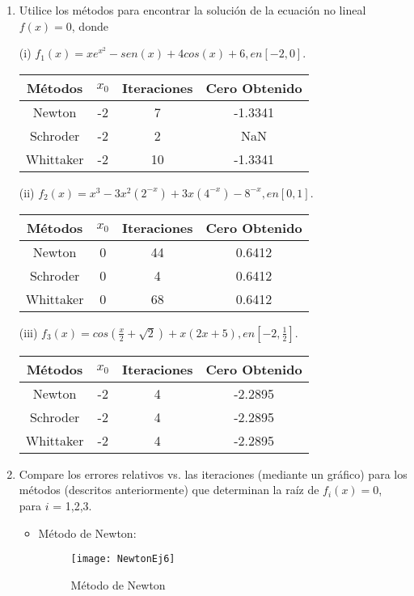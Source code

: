 \documentclass{udpreport}
\begin{document}
\begin{enumerate}
\begin{itemize}
\end{itemize}
	\begin{enumerate}
	
		\item Utilice los métodos para encontrar la solución de la ecuación no lineal $f(x)=0$, donde
		
		(i) $f_{1}(x)=xe^{x^2}-sen(x)+4cos(x)+6, en [-2,0].$
		
		\begin{table}[H]
			\centering
			\begin{tabular}{|c|c|c|c|}
				\hline
				Métodos & $x_{0}$ & Iteraciones & Cero Obtenido \\
				\hline
				Newton & -2 &  7 & -1.3341\\
				\hline
				Schroder & -2 & 2 & NaN \\
				\hline
				Whittaker & -2 & 10 & -1.3341 \\
				\hline				
			\end{tabular}
			\end{table}	
		
		
		
		(ii) $f_{2}(x)=x^3-3x^2(2^{-x})+3x(4^{-x})-8^{-x}, en [0,1].$
		
			\begin{table}[H]
			\centering
			\begin{tabular}{|c|c|c|c|}
				\hline
				Métodos & $x_{0}$ & Iteraciones & Cero Obtenido \\
				\hline
				Newton & 0 & 44 &  0.6412 \\
				\hline
				Schroder & 0 & 4 & 0.6412\\
				\hline
				Whittaker & 0 & 68 & 0.6412\\
				\hline				
			\end{tabular}
			\end{table}	
			
		(iii) $f_{3}(x)=cos(\frac{x}{2}+\sqrt{2})+x(2x+5), en [-2,\frac{1}{2}].$	
		
		\begin{table}[H]
			\centering
			\begin{tabular}{|c|c|c|c|}
				\hline
				Métodos & $x_{0}$ & Iteraciones & Cero Obtenido \\
				\hline
				Newton & -2 & 4 &  -2.2895 \\
				\hline
				Schroder & -2 &  4 & -2.2895\\
				\hline
				Whittaker & -2 & 4 & -2.2895 \\
				\hline				
			\end{tabular}
		\end{table}		
\newpage			
		\item Compare los errores relativos vs. las iteraciones (mediante un gráfico) para los métodos (descritos
			anteriormente) que determinan la raíz de $f_{i}(x)=0$, para $i$ = 1,2,3.	
			\begin{itemize}
				\item Método de Newton:
				\begin{figure}[H]
					\centering	
						\texttt{[image: NewtonEj6]} 
						\caption{Método de Newton}
				\end{figure}
								

\end{itemize}
\end{enumerate}
\end{enumerate}
\end{document}
